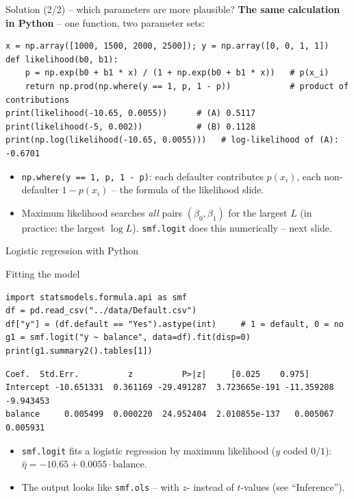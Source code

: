 \documentclass[aspectratio=169,11pt]{beamer}
\begin{document}
\begin{frame}[fragile]{Solution (2/2) -- which parameters are more plausible?}
  \textbf{The same calculation in Python} -- one function, two parameter sets:
\begin{lstlisting}
x = np.array([1000, 1500, 2000, 2500]); y = np.array([0, 0, 1, 1])
def likelihood(b0, b1):
    p = np.exp(b0 + b1 * x) / (1 + np.exp(b0 + b1 * x))   # p(x_i)
    return np.prod(np.where(y == 1, p, 1 - p))            # product of contributions
print(likelihood(-10.65, 0.0055))      # (A) 0.5117
print(likelihood(-5, 0.002))           # (B) 0.1128
print(np.log(likelihood(-10.65, 0.0055)))   # log-likelihood of (A): -0.6701
\end{lstlisting}
  \begin{itemize}\setlength{\itemsep}{3pt}
    \item \texttt{np.where(y == 1, p, 1 - p)}: each defaulter contributes
          $p(x_i)$, each non-defaulter $1-p(x_i)$ -- the formula of the
          likelihood slide.
    \item Maximum likelihood searches \emph{all} pairs $(\beta_0,\beta_1)$
          for the largest $L$ (in practice: the largest $\log L$).
          \texttt{smf.logit} does this numerically -- next slide.
  \end{itemize}
\end{frame}

\begin{frame}[fragile]{Logistic regression with Python}
  \begin{block}{Fitting the model}
\begin{lstlisting}
import statsmodels.formula.api as smf
df = pd.read_csv("../data/Default.csv")
df["y"] = (df.default == "Yes").astype(int)     # 1 = default, 0 = no
g1 = smf.logit("y ~ balance", data=df).fit(disp=0)
print(g1.summary2().tables[1])
\end{lstlisting}
  \end{block}
\begin{lstlisting}[style=Pyout]
               Coef.  Std.Err.          z          P>|z|     [0.025    0.975]
Intercept -10.651331  0.361169 -29.491287  3.723665e-191 -11.359208 -9.943453
balance     0.005499  0.000220  24.952404  2.010855e-137   0.005067  0.005931
\end{lstlisting}
  \begin{itemize}\setlength{\itemsep}{2pt}
    \item \texttt{smf.logit} fits a logistic regression by maximum
          likelihood ($y$ coded $0/1$): $\hat\eta=-10.65+0.0055\cdot\text{balance}$.
    \item The output looks like \texttt{smf.ols} -- with $z$- instead of
          $t$-values (see ``Inference'').
  \end{itemize}
\end{frame}
\end{document}
